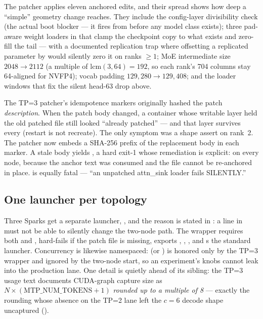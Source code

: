 The patcher applies eleven anchored edits, and their spread shows how deep a
``simple'' geometry change reaches. They include the config-layer
divisibility check (the actual boot blocker --- it fires from
 before any model class exists); three pad-aware
weight loaders in  that clamp the checkpoint copy to
what exists and zero-fill the tail --- with a documented replication trap
where offsetting a replicated parameter by  would silently
zero it on ranks $\ge 1$; MoE intermediate size $2048 \to 2112$ (a multiple
of $\mathrm{lcm}(3,64)=192$, so each rank's 704 columns stay 64-aligned for
NVFP4); vocab padding $129{,}280 \to 129{,}408$;
and the  loader windows that fix the silent head-63 drop
above.

\begin{hbwarstory}
The TP=3 patcher's idempotence markers originally hashed the patch
\emph{description}. When the patch body changed, a container whose writable
layer held the old patched file still looked ``already patched'' --- and that
layer survives every  (restart is not recreate).
The only symptom was a shape assert on rank~2. The patcher now embeds a
SHA-256 prefix of the replacement body in each marker. A stale body yields
, a hard exit-1 whose remediation is explicit: 
on every node, because the anchor text was consumed and the file cannot be
re-anchored in place.  is equally fatal --- ``an unpatched
attn\_sink loader fails SILENTLY.''
\end{hbwarstory}

\subsection{One launcher per topology}

Three Sparks get a separate launcher, , and the reason
is stated in : a  line in
 must not be able to silently change the two-node path.
The wrapper requires both  and ,
hard-fails if the patch file is missing, exports ,
, , and s the standard
launcher. Concurrency is likewise namespaced: 
(or ) is honored only by the TP=3 wrapper and ignored
by the two-node start, so an experiment's knobs cannot leak into the
production lane. One detail is quietly ahead of its sibling: the TP=3 usage
text documents CUDA-graph capture size as
$N \times (\text{MTP\_NUM\_TOKENS}+1)$ \emph{rounded up to a multiple of 8}
--- exactly the rounding whose absence on the TP=2 lane left the $c{=}6$
decode shape uncaptured ().

